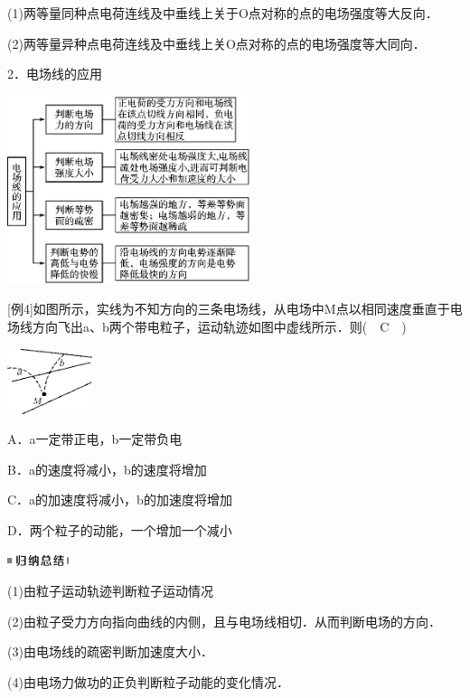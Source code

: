 \documentclass[cn,10.5pt,chinese,mac,chinesefont=founder]{elegantbook}
\begin{document}
(1)两等量同种点电荷连线及中垂线上关于O点对称的点的电场强度等大反向．

(2)两等量异种点电荷连线及中垂线上关O点对称的点的电场强度等大同向．

2．电场线的应用

\begin{center}\includegraphics[width=2.8125in,height=2.16667in]{media/image265.png}\end{center}
{[}例4{]}如图所示，实线为不知方向的三条电场线，从电场中M点以相同速度垂直于电场线方向飞出a、b两个带电粒子，运动轨迹如图中虚线所示．则(　C　)

\begin{center}\includegraphics[width=0.97917in,height=0.75in]{media/image266.png}\end{center}

A．a一定带正电，b一定带负电

B．a的速度将减小，b的速度将增加

C．a的加速度将减小，b的加速度将增加

D．两个粒子的动能，一个增加一个减小

\begin{center}\includegraphics[width=0.70833in,height=0.125in]{media/image13.png}\end{center}

(1)由粒子运动轨迹判断粒子运动情况

(2)由粒子受力方向指向曲线的内侧，且与电场线相切．从而判断电场的方向．

(3)由电场线的疏密判断加速度大小．

(4)由电场力做功的正负判断粒子动能的变化情况．
\end{document}
